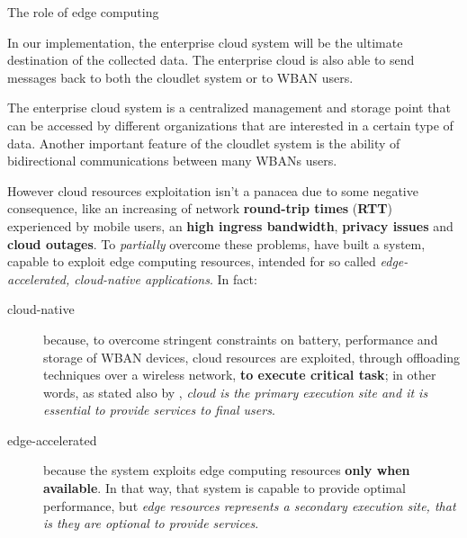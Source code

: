\documentclass[10pt]{beamer}
\begin{document}
\begin{frame}{The role of edge computing}
\vspace{0.3cm}

\begin{quoting}[font=itshape, begintext={``}, endtext={''\cite[par.~3.2]{MSAReport}}]
In our implementation, the enterprise cloud system will be the ultimate destination of the collected data. The enterprise cloud is also able to send messages back to both the cloudlet system or to WBAN users.
\end{quoting}

\vspace{0.3cm}

\begin{quoting}[font=itshape, begintext={``}, endtext={''\cite[par.~4.1]{MSAReport}}]
The enterprise cloud system is a centralized management and storage point that can be accessed by different organizations that are interested in a certain type of data. Another important feature of the cloudlet system is the ability of bidirectional communications between many WBANs users.
\end{quoting}

\vspace{0.3cm}

However cloud resources exploitation isn't a panacea due to some negative consequence, like an increasing of network \textbf{round-trip times} (\textbf{RTT}) experienced by mobile users, an \textbf{high ingress bandwidth}, \textbf{privacy issues} and \textbf{cloud outages}. To \textit{partially} overcome these problems, \citet{MSAReport} have built a system, capable to exploit edge computing resources, intended for so called \textit{edge-accelerated, cloud-native applications}. \cite{TheSeminalRoleEdgeNativeApplications}\cite{TheEmergenceOfEdgeComputing} In fact:

\begin{description}

\item[cloud-native] because, to overcome stringent constraints on battery, performance and storage of WBAN devices, cloud resources are exploited, through offloading techniques over a wireless network, \textbf{to execute critical task}; in other words, as stated also by \citet{MSAReport}, \textit{cloud is the primary execution site and it is essential to provide services to final users}.

\item[edge-accelerated] because the system exploits edge computing resources \textbf{only when available}. In that way, that system is capable to provide optimal performance, but \textit{edge resources represents a secondary execution site, that is they are optional to provide services}.


\end{description}
\end{frame}
\end{document}
